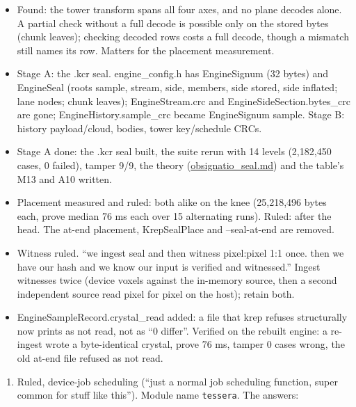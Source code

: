 \begin{itemize}
\item Found: the tower transform spans all four axes, and no plane decodes alone. A partial check without a full decode is possible only on the stored bytes (chunk leaves); checking decoded rows costs a full decode, though a mismatch still names its row. Matters for the placement measurement.
\item Stage A: the .kcr seal. engine\_\allowbreak{}config.h has EngineSignum (32 bytes) and EngineSeal (roots sample, stream, side, members, side stored, side inflated; lane nodes; chunk leaves); EngineStream.crc and EngineSideSection.bytes\_\allowbreak{}crc are gone; EngineHistory.sample\_\allowbreak{}crc became EngineSignum sample. Stage B: history payload/cloud, bodies, tower key/schedule CRCs.
\item Stage A done: the .kcr seal built, the suite rerun with 14 levels (2,182,450 cases, 0 failed), tamper 9/9, the theory (\hyperref[chap:obsignatio-seal]{obsignatio\_\allowbreak{}seal.md}) and the table's M13 and A10 written.
\item Placement measured and ruled: both alike on the knee (25,218,496 bytes each, prove median 76 ms each over 15 alternating runs). Ruled: after the head. The at-end placement, KrepSealPlace and --seal-at-end are removed.
\item Witness ruled. “we ingest seal and then witness pixel:pixel 1:1 once. then we have our hash and we know our input is verified and witnessed.” Ingest witnesses twice (device voxels against the in-memory source, then a second independent source read pixel for pixel on the host); retain both.
\item EngineSampleRecord.crystal\_\allowbreak{}read added: a file that krep refuses structurally now prints as not read, not as “0 differ”. Verified on the rebuilt engine: a re-ingest wrote a byte-identical crystal, prove 76 ms, tamper 0 cases wrong, the old at-end file refused as not read.
\end{itemize}

\begin{enumerate}
\item Ruled, device-job scheduling (“just a normal job scheduling function, super common for stuff like this”). Module name \texttt{tessera}. The answers:
\end{enumerate}

